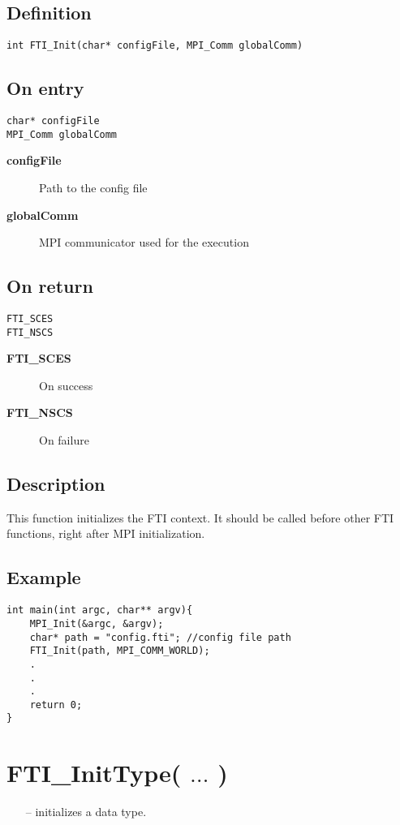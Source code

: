 \documentclass{refrep}
\begin{document}
\subsection*{Definition}
\begin{lstlisting}[frame=single]
int FTI_Init(char* configFile, MPI_Comm globalComm)
\end{lstlisting}
\subsection*{On entry}
\begin{lstlisting}[frame=single]
char* configFile
MPI_Comm globalComm
\end{lstlisting}
\begin{description}
\item[\textbf{configFile}] Path to the config file
\item[\textbf{globalComm}] MPI communicator used for the execution
\end{description}
\subsection*{On return}
\begin{lstlisting}[frame=single]
FTI_SCES
FTI_NSCS
\end{lstlisting}
\begin{description}
\item[\textbf{FTI\_SCES}] On success
\item[\textbf{FTI\_NSCS}] On failure
\end{description}
\subsection*{Description}
This function initializes the FTI context. It should be called before other FTI functions, right after MPI initialization.
\subsection*{Example}
\begin{center}
\begin{lstlisting}[frame=single]
int main(int argc, char** argv){
    MPI_Init(&argc, &argv);
    char* path = "config.fti"; //config file path
    FTI_Init(path, MPI_COMM_WORLD);
    .
    .
    .
    return 0;
} 
\end{lstlisting}
\end{center}
\newpage
\section{\asciifamily FTI\_InitType( $\dots$ )}\label{sec:ftiinittype}
\begin{framed}
\begin{itemize}
\item[--] initializes a data type.
\end{itemize}
\end{framed}
\end{document}
